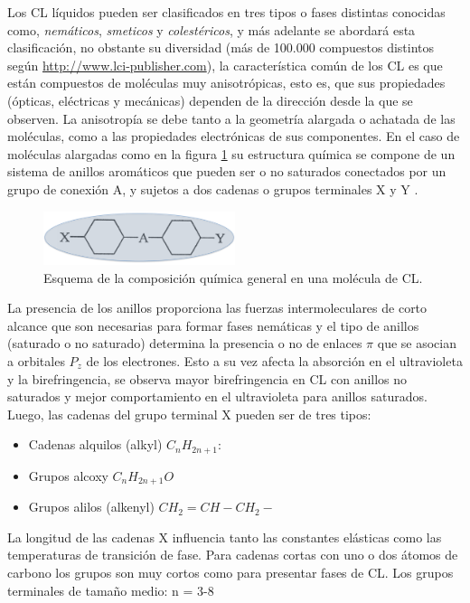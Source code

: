 Los CL líquidos pueden ser clasificados en tres tipos o fases distintas
conocidas como, \textit{nemáticos},
\textit{smeticos} y \textit{colestéricos}, y más adelante se abordará esta
clasificación, no obstante su diversidad (más de 100.000 compuestos
distintos según \url{http://www.lci-publisher.com}), la característica común de los CL es que están
compuestos de moléculas muy anisotrópicas, esto es, que sus
propiedades (ópticas, eléctricas y mecánicas) dependen de la
dirección desde la que se observen. La anisotropía se debe tanto a la
geometría alargada o achatada de las moléculas, como a las propiedades
electrónicas de sus componentes.  En el caso de moléculas
alargadas como en la figura \ref{fig:LCMolecule} su estructura química se
compone de un sistema de anillos aromáticos que pueden ser o no
saturados conectados por un grupo de conexión A, y sujetos a dos
cadenas o grupos terminales X y Y . 
\begin{figure}[h!]
\centering
    \includegraphics[width=0.5\textwidth]{LCMolecule}
\caption{Esquema de la composición química general en una molécula de CL.}
\label{fig:LCMolecule}
\end{figure}
La presencia de los anillos proporciona las fuerzas intermoleculares de corto alcance que
son necesarias para formar fases nemáticas y el tipo de anillos
(saturado o no saturado) determina la presencia o no de enlaces $\pi$
que se asocian a orbitales $P_z$ de los electrones. Esto a su vez
afecta la absorción en el ultravioleta y la birefringencia, se observa mayor
birefringencia en CL con anillos no saturados y mejor comportamiento
en el ultravioleta para anillos saturados.  Luego, las cadenas del
grupo terminal X pueden ser de tres tipos:
\begin{itemize}
\item Cadenas alquilos (alkyl)  $C_nH_{2n+1}$: 
\item Grupos alcoxy $C_nH_{2n+1}O$
\item Grupos alilos (alkenyl) $CH_2=CH-CH_2-$
\end{itemize}
 La longitud de las cadenas X influencia tanto las constantes elásticas
 como las temperaturas de transición de fase. Para cadenas cortas con
 uno o dos átomos de carbono los grupos son muy cortos como para
 presentar fases de CL. Los grupos terminales de tamaño medio: n = 3-8
